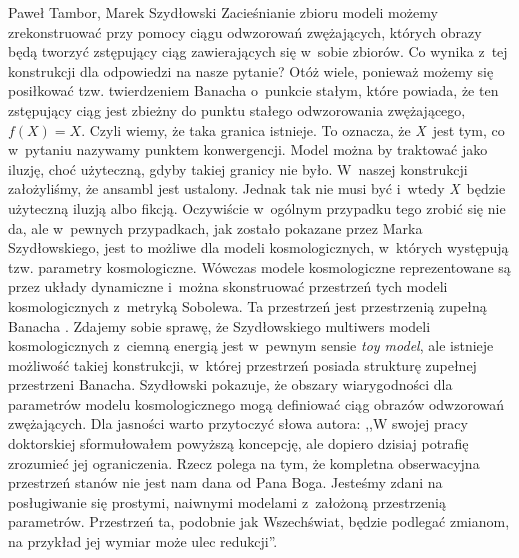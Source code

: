 \begin{artplenv2auth}{Paweł Tambor, Marek Szydłowski}
Zacieśnianie zbioru modeli możemy zrekonstruować przy pomocy ciągu odwzorowań zwężających, których obrazy będą tworzyć zstępujący ciąg zawierających się w~sobie zbiorów. Co wynika z~tej konstrukcji dla odpowiedzi na nasze pytanie? Otóż wiele, ponieważ możemy się posiłkować tzw. twierdzeniem Banacha o~punkcie stałym, które powiada, że ten zstępujący ciąg jest zbieżny do punktu stałego odwzorowania zwężającego, $f(X)=X$. Czyli wiemy, że taka granica istnieje. To oznacza, że \textit{X}~jest tym, co w~pytaniu nazywamy punktem konwergencji. Model można by traktować jako iluzję, choć użyteczną, gdyby takiej granicy nie było. W~naszej konstrukcji założyliśmy, że ansambl jest ustalony. Jednak tak nie musi być i~wtedy \textit{X}~będzie użyteczną iluzją albo fikcją. Oczywiście w~ogólnym przypadku tego zrobić się nie da, ale w~pewnych przypadkach, jak zostało pokazane przez Marka Szydłowskiego, jest to możliwe dla modeli kosmologicznych, w~których występują tzw. parametry kosmologiczne. Wówczas modele kosmologiczne reprezentowane są przez układy dynamiczne i~można skonstruować przestrzeń tych modeli kosmologicznych z~metryką Sobolewa. Ta przestrzeń jest przestrzenią zupełną Banacha
\parencite[][]{szydlowski_cosmological_2007}. %
 Zdajemy sobie sprawę, że Szydłowskiego multiwers modeli kosmologicznych z~ciemną energią jest w~pewnym sensie \textit{toy model}, ale istnieje możliwość takiej konstrukcji, w~której przestrzeń posiada strukturę zupełnej przestrzeni Banacha. Szydłowski pokazuje, że obszary wiarygodności dla parametrów modelu kosmologicznego mogą definiować ciąg obrazów odwzorowań zwężających. Dla jasności warto przytoczyć słowa autora: ,,W swojej pracy doktorskiej sformułowałem powyższą koncepcję, ale dopiero dzisiaj potrafię zrozumieć jej ograniczenia. Rzecz polega na tym, że kompletna obserwacyjna przestrzeń stanów nie jest nam dana od Pana Boga. Jesteśmy zdani na posługiwanie się prostymi, naiwnymi modelami z~założoną przestrzenią parametrów. Przestrzeń ta, podobnie jak Wszechświat, będzie podlegać zmianom, na przykład jej wymiar może ulec redukcji''.


\end{artplenv2auth}
